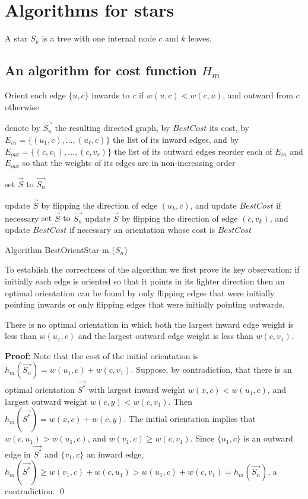  \section{Algorithms for stars}\label{s.1}
 A star $S_k$ is a tree with one internal node $c$ and $k$ leaves.

 \subsection{An algorithm for cost function $H_m$}
 \begin{algorithm}
Orient each edge $\{u,c\}$ inwards to \textit{c} if $w(u,c)<w(c,u)$,
and outward from $c$ otherwise\; \label{i0}
 	 
denote by $\vec{S_n}$ the resulting directed graph, by $BestCost$ its cost, 
by $E_{in}=\{(u_1,c),\ldots, (u_{\ell},c)\}$ the list of its inward edges, 
and by $E_{out}=\{(c,v_1),\ldots, (c,v_r)\}$ the list of its outward edges\;
\label{i00} reorder each of $E_{in}$ and $E_{out}$ so that
the weights of its edges are in non-increasing order\;

set $\vec{S}$ to $\vec{S_n}$\;

  {update $\vec{S}$ by flipping the direction of edge $(u_k,c)$, and update $BestCost$ if necessary}
   \label{i1} 
set $\vec{S}$ to $\vec{S_n}$\;
   {update $\vec{S}$ by flipping the direction of edge $(c,v_k)$, and update $BestCost$ if necessary}
  \label{i2}
 	\Return an orientation whose cost is $BestCost$\;
 	\caption{Algorithm BestOrientStar-m ($S_n$)}
 	\label{algo:oc-s}
 \end{algorithm}

\bigskip

To establish the correctness of the algorithm we first prove its key observation:  
if initially  each edge is oriented
so that it points in its lighter direction then an optimal orientation can be
found by only flipping edges that were initially pointing inwards or only
flipping edges that were initially pointing outwards. 
\begin{lemma}\label{l.best}
	There is no optimal orientation in which both the largest inward edge weight is less than $w(u_1,c)$ 
	and the largest outward edge weight is less than $w(c,v_1)$.
\end{lemma}

\noindent \textbf{Proof:}
Note that the cost of the initial orientation is $h_m(\vec{S_n})=w(u_1,c)+w(c,v_1)$.
Suppose, by contradiction, that there is an optimal orientation $\vec{S^*}$ 
with largest inward weight $w(x,c)< w(u_1,c)$,
and largest outward weight $w(c,y)<w(c,v_1)$.
Then $h_m(\vec{S^*})=w(x,c)+w(c,y)$.
The initial orientation implies that $w(c,u_1) > w(u_1,c)$, and $w(v_1,c) \geq w(c,v_1)$.
Since $\{u_1,c\}$ is an outward edge in $\vec{S^*}$ and $\{v_1,c\}$ an inward edge,
$h_m(\vec{S^*})\geq  
w(v_1,c)+w(c,u_1) >  w(u_1,c)+w(c,v_1) =h_m(\vec{S_n})$, a contradiction.
\qed

